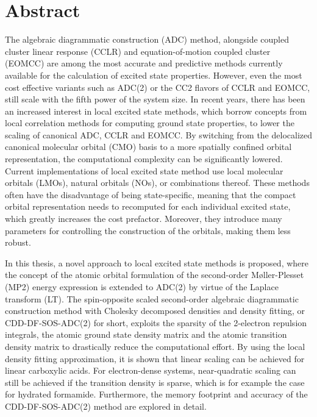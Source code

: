 \chapter*{Abstract}

The algebraic diagrammatic construction (ADC) method, alongside coupled cluster linear response (CCLR) and equation-of-motion coupled cluster (EOMCC) are among the most accurate and predictive methods currently available for the calculation of excited state properties. However, even the most cost effective variants such as ADC(2) or the CC2 flavors of CCLR and EOMCC, still scale with the fifth power of the system size. In recent years, there has been an increased interest in local excited state methods, which borrow concepts from local correlation methods for computing ground state properties, to lower the scaling of canonical ADC, CCLR and EOMCC. By switching from the delocalized canonical molecular orbital (CMO) basis to a more spatially confined orbital representation, the computational complexity can be significantly lowered. Current implementations of local excited state method use local molecular orbitals (LMOs), natural orbitals (NOs), or combinations thereof. These methods often have the disadvantage of being state-specific, meaning that the compact orbital representation needs to recomputed for each individual excited state, which greatly increases the cost prefactor. Moreover, they introduce many parameters for controlling the construction of the orbitals, making them less robust.

In this thesis, a novel approach to local excited state methods is proposed, where the concept of the atomic orbital formulation of the second-order M{\o}ller-Plesset (MP2) energy expression is extended to ADC(2) by virtue of the Laplace transform (LT). The spin-opposite scaled second-order algebraic diagrammatic construction method with Cholesky decomposed densities and density fitting, or CDD-DF-SOS-ADC(2) for short, exploits the sparsity of the 2-electron repulsion integrals, the atomic ground state density matrix and the atomic transition density matrix to drastically reduce the computational effort. By using the local density fitting approximation, it is shown that linear scaling can be achieved for linear carboxylic acids. For electron-dense systems, near-quadratic scaling can still be achieved if the transition density is sparse, which is for example the case for hydrated formamide. Furthermore, the memory footprint and accuracy of the CDD-DF-SOS-ADC(2) method are explored in detail.

